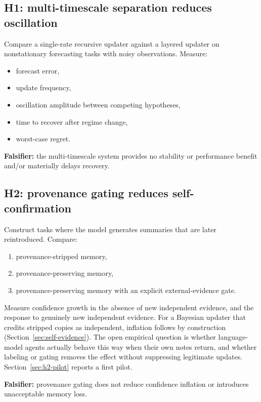 \documentclass[11pt]{article}
\begin{document}
\subsection{H1: multi-timescale separation reduces oscillation}

Compare a single-rate recursive updater against a layered updater on nonstationary forecasting tasks with noisy observations. Measure:

\begin{itemize}
    \item forecast error,
    \item update frequency,
    \item oscillation amplitude between competing hypotheses,
    \item time to recover after regime change,
    \item worst-case regret.
\end{itemize}

\textbf{Falsifier:} the multi-timescale system provides no stability or performance benefit and/or materially delays recovery.

\subsection{H2: provenance gating reduces self-confirmation}

Construct tasks where the model generates summaries that are later reintroduced. Compare:

\begin{enumerate}
    \item provenance-stripped memory,
    \item provenance-preserving memory,
    \item provenance-preserving memory with an explicit external-evidence gate.
\end{enumerate}

Measure confidence growth in the absence of new independent evidence, and the response to genuinely new independent evidence. For a Bayesian updater that credits stripped copies as independent, inflation follows by construction (Section~\ref{sec:self-evidence}). The open empirical question is whether language-model agents actually behave this way when their own notes return, and whether labeling or gating removes the effect without suppressing legitimate updates. Section~\ref{sec:h2-pilot} reports a first pilot.

\textbf{Falsifier:} provenance gating does not reduce confidence inflation or introduces unacceptable memory loss.
\end{document}

